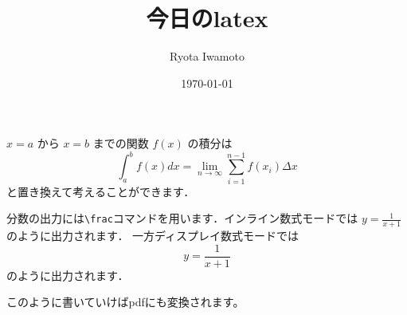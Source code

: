 \documentclass[a4paper,11pt]{jsarticle}
\begin{document}
\title{今日のlatex}
\author{Ryota Iwamoto}
\date{\today}
\maketitle

$ x = a $ から \( x = b \) までの関数 $f(x)$ の積分は
\begin{equation}
\int^{b}_{a} f(x) dx = \lim_{n \to \infty} \sum^{n-1}_{i=1} f(x_{i}) \Delta x
\end{equation}
と置き換えて考えることができます．

分数の出力には\verb+\frac+コマンドを用います．インライン数式モードでは
$ y = \frac{1}{x+1} $のように出力されます．
一方ディスプレイ数式モードでは
\begin{displaymath}
 y = \frac{1}{x+1}
\end{displaymath}
のように出力されます．

このように書いていけばpdfにも変換されます。
\end{document}
